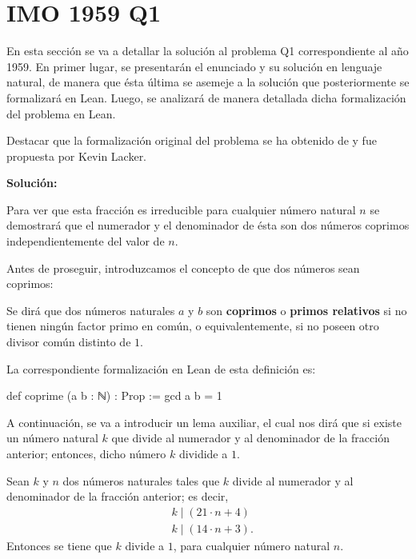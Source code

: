 \section{IMO 1959 Q1}

En esta sección se va a detallar la solución al problema Q1
correspondiente al año 1959. En primer lugar, se presentarán el
enunciado y su solución en lenguaje natural, de manera que ésta última
se asemeje a la solución que posteriormente se formalizará en
Lean. Luego, se analizará de manera detallada dicha formalización del
problema en Lean.

Destacar que la formalización original del problema se ha
obtenido de \cite{KL} y fue propuesta por Kevin Lacker.

\noindent
{}

\textbf{Solución:}

Para ver que esta fracción es irreducible para cualquier número natural
\(n\) se demostrará que el numerador y el denominador de ésta son dos
números coprimos independientemente del valor de \(n\).

Antes de proseguir, introduzcamos el concepto de que dos números sean
coprimos:

\begin{definicion}\label{coprimos}
  Se dirá que dos números naturales \(a\) y \(b\) son \textbf{coprimos}
  o \textbf{primos relativos} si no tienen ningún factor primo en común,
  o equivalentemente, si no poseen otro divisor común distinto de \(1\).
\end{definicion}

La correspondiente formalización en Lean de esta definición es:

\begin{leancode}
  def coprime (a b : ℕ) : Prop := gcd a b = 1
\end{leancode}

A continuación, se va a introducir un lema auxiliar, el cual nos dirá
que si existe un número natural \(k\) que divide al numerador y al
denominador de la fracción anterior; entonces, dicho número \(k\)
dividide a \(1\).

\begin{lema}[Auxiliar]\label{lema}
  Sean \(k\) y \(n\) dos números naturales tales que \(k\) divide al
  numerador y al denominador de la fracción anterior; es decir,
  \begin{align}
    & k \mid (21⋅n+4)   \label{h1}\tag{h1} \\
    & k \mid (14⋅n+3).  \label{h2}\tag{h2}
  \end{align}
  Entonces se tiene que \(k\) divide a \(1\), para cualquier número
  natural \(n\).
\end{lema}

